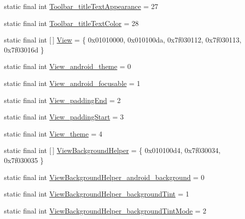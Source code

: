 \begin{DoxyCompactItemize}
\item 
static final int \mbox{\hyperlink{classandroid_1_1support_1_1design_1_1R_1_1styleable_a2cbcc72025cb5da4d094b8250deacd64}{Toolbar\+\_\+title\+Text\+Appearance}} = 27
\item 
static final int \mbox{\hyperlink{classandroid_1_1support_1_1design_1_1R_1_1styleable_a6cc4632e269ce480a68bcce27c2815d5}{Toolbar\+\_\+title\+Text\+Color}} = 28
\item 
static final int \mbox{[}$\,$\mbox{]} \mbox{\hyperlink{classandroid_1_1support_1_1design_1_1R_1_1styleable_ae848bcf5b638b9248537d28ebf90c67f}{View}} = \{ 0x01010000, 0x010100da, 0x7f030112, 0x7f030113, 0x7f03016d \}
\item 
static final int \mbox{\hyperlink{classandroid_1_1support_1_1design_1_1R_1_1styleable_a3d64256b1ef377ea472c9b16e3d9ca72}{View\+\_\+android\+\_\+theme}} = 0
\item 
static final int \mbox{\hyperlink{classandroid_1_1support_1_1design_1_1R_1_1styleable_a011b87eb64cd314c6de1fcb3394fcb1d}{View\+\_\+android\+\_\+focusable}} = 1
\item 
static final int \mbox{\hyperlink{classandroid_1_1support_1_1design_1_1R_1_1styleable_a39d2f956f97b594db965bf5bf2ab140c}{View\+\_\+padding\+End}} = 2
\item 
static final int \mbox{\hyperlink{classandroid_1_1support_1_1design_1_1R_1_1styleable_a32303521941b6c1b55688083d340802d}{View\+\_\+padding\+Start}} = 3
\item 
static final int \mbox{\hyperlink{classandroid_1_1support_1_1design_1_1R_1_1styleable_a354c42dd69296d28a7ecf2124e7b062d}{View\+\_\+theme}} = 4
\item 
static final int \mbox{[}$\,$\mbox{]} \mbox{\hyperlink{classandroid_1_1support_1_1design_1_1R_1_1styleable_a7df8d9542168fb1f80021c7e5b776ddb}{View\+Background\+Helper}} = \{ 0x010100d4, 0x7f030034, 0x7f030035 \}
\item 
static final int \mbox{\hyperlink{classandroid_1_1support_1_1design_1_1R_1_1styleable_ac20c4e59460f7e880c63b69c5b38b04e}{View\+Background\+Helper\+\_\+android\+\_\+background}} = 0
\item 
static final int \mbox{\hyperlink{classandroid_1_1support_1_1design_1_1R_1_1styleable_af1863103f3bd67eddcd4df9bc5602067}{View\+Background\+Helper\+\_\+background\+Tint}} = 1
\item 
static final int \mbox{\hyperlink{classandroid_1_1support_1_1design_1_1R_1_1styleable_a10377d2903195cc827b6074c9a338504}{View\+Background\+Helper\+\_\+background\+Tint\+Mode}} = 2

\end{DoxyCompactItemize}
